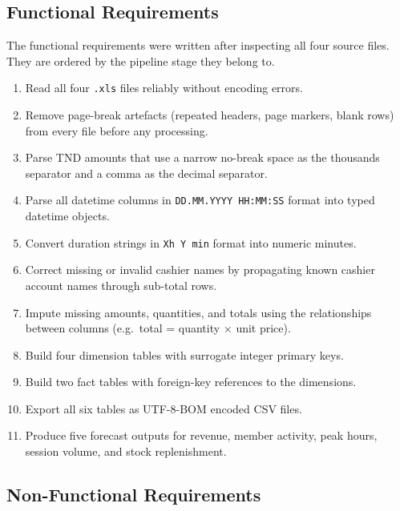 \documentclass[12pt, a4paper]{report}
\begin{document}
\subsection{Functional Requirements}

The functional requirements were written after inspecting all four source files.
They are ordered by the pipeline stage they belong to.

\begin{enumerate}
  \item Read all four \texttt{.xls} files reliably without encoding errors.
  \item Remove page-break artefacts (repeated headers, page markers, blank rows)
        from every file before any processing.
  \item Parse TND amounts that use a narrow no-break space as the thousands
        separator and a comma as the decimal separator.
  \item Parse all datetime columns in \texttt{DD.MM.YYYY~HH:MM:SS} format into
        typed datetime objects.
  \item Convert duration strings in \texttt{Xh~Y~min} format into numeric minutes.
  \item Correct missing or invalid cashier names by propagating known cashier
        account names through sub-total rows.
  \item Impute missing amounts, quantities, and totals using the relationships
        between columns (e.g.\ total = quantity $\times$ unit price).
  \item Build four dimension tables with surrogate integer primary keys.
  \item Build two fact tables with foreign-key references to the dimensions.
  \item Export all six tables as UTF-8-BOM encoded CSV files.
  \item Produce five forecast outputs for revenue, member activity, peak hours,
        session volume, and stock replenishment.
\end{enumerate}

\subsection{Non-Functional Requirements}
\end{document}
